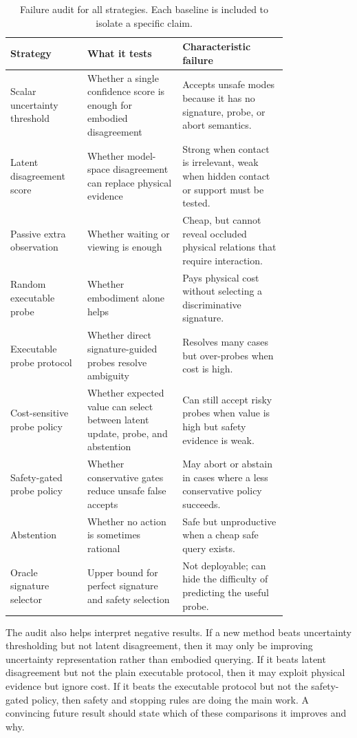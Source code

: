 \documentclass{article}
\begin{document}
\begin{table}[p]
\centering
\small
\begin{tabular}{p{0.20\linewidth}p{0.29\linewidth}p{0.31\linewidth}}
\toprule
Strategy & What it tests & Characteristic failure \\
\midrule
Scalar uncertainty threshold & Whether a single confidence score is enough for embodied disagreement & Accepts unsafe modes because it has no signature, probe, or abort semantics. \\
Latent disagreement score & Whether model-space disagreement can replace physical evidence & Strong when contact is irrelevant, weak when hidden contact or support must be tested. \\
Passive extra observation & Whether waiting or viewing is enough & Cheap, but cannot reveal occluded physical relations that require interaction. \\
Random executable probe & Whether embodiment alone helps & Pays physical cost without selecting a discriminative signature. \\
Executable probe protocol & Whether direct signature-guided probes resolve ambiguity & Resolves many cases but over-probes when cost is high. \\
Cost-sensitive probe policy & Whether expected value can select between latent update, probe, and abstention & Can still accept risky probes when value is high but safety evidence is weak. \\
Safety-gated probe policy & Whether conservative gates reduce unsafe false accepts & May abort or abstain in cases where a less conservative policy succeeds. \\
Abstention & Whether no action is sometimes rational & Safe but unproductive when a cheap safe query exists. \\
Oracle signature selector & Upper bound for perfect signature and safety selection & Not deployable; can hide the difficulty of predicting the useful probe. \\
\bottomrule
\end{tabular}
\caption{Failure audit for all strategies. Each baseline is included to isolate a specific claim.}
\label{tab:strategy_failure_audit}
\end{table}

The audit also helps interpret negative results. If a new method beats uncertainty thresholding but not latent disagreement, then it may only be improving uncertainty representation rather than embodied querying. If it beats latent disagreement but not the plain executable protocol, then it may exploit physical evidence but ignore cost. If it beats the executable protocol but not the safety-gated policy, then safety and stopping rules are doing the main work. A convincing future result should state which of these comparisons it improves and why.
\end{document}
